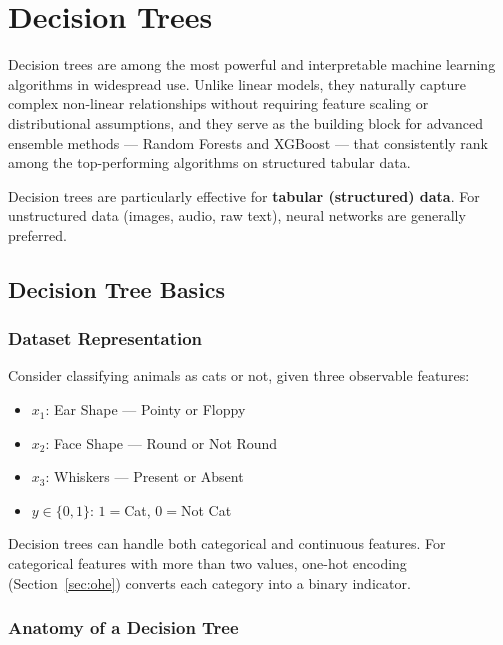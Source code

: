 \chapter{Decision Trees}

Decision trees are among the most powerful and interpretable machine learning
algorithms in widespread use. Unlike linear models, they naturally capture
complex non-linear relationships without requiring feature scaling or
distributional assumptions, and they serve as the building block for advanced
ensemble methods --- Random Forests and XGBoost --- that consistently rank
among the top-performing algorithms on structured tabular data.

\begin{remark}
Decision trees are particularly effective for \textbf{tabular (structured)
data}. For unstructured data (images, audio, raw text), neural networks are
generally preferred.
\end{remark}

\section{Decision Tree Basics}

\subsection{Dataset Representation}

Consider classifying animals as cats or not, given three observable features:
\begin{itemize}
\item $x_1$: Ear Shape --- Pointy or Floppy
\item $x_2$: Face Shape --- Round or Not Round
\item $x_3$: Whiskers --- Present or Absent
\item $y\in\{0,1\}$: $1=$Cat, $0=$Not Cat
\end{itemize}

Decision trees can handle both categorical and continuous features. For
categorical features with more than two values, one-hot encoding
(Section~\ref{sec:ohe}) converts each category into a binary indicator.

\subsection{Anatomy of a Decision Tree}


